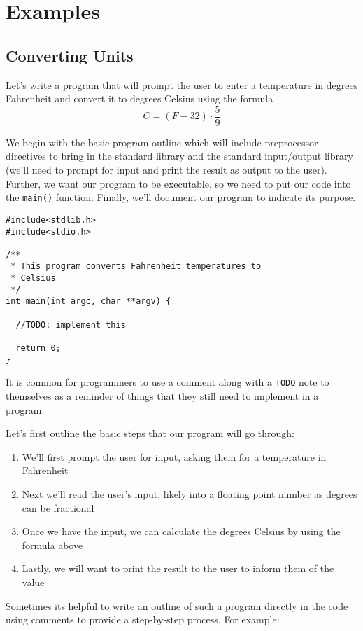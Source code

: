 \section{Examples}

\subsection{Converting Units}

Let's write a program that will prompt the user to enter a temperature
in degrees Fahrenheit and convert it to degrees Celsius using the formula
  $$C = (F - 32) \cdot \frac{5}{9}$$

We begin with the basic program outline which will include preprocessor directives to bring
in the standard library and the standard input/output library (we'll need to prompt
for input and print the result as output to the user).  Further, we want our program to 
be executable, so we need to put our code into the \texttt{main()} function.  Finally, we'll document
our program to indicate its purpose.

\begin{verbatim}
#include<stdlib.h>
#include<stdio.h>

/**
 * This program converts Fahrenheit temperatures to 
 * Celsius
 */
int main(int argc, char **argv) {

  //TODO: implement this
  
  return 0;
}
\end{verbatim}

It is common for programmers to use a comment along with a \texttt{TODO} note to
themselves as a reminder of things that they still need to implement in a program.  

Let's first outline the basic steps that our program will go through:
\begin{enumerate}
  \item We'll first prompt the user for input, asking them for a temperature in Fahrenheit
  \item Next we'll read the user's input, likely into a floating point number as degrees can be fractional
  \item Once we have the input, we can calculate the degrees Celsius by using the formula above
  \item Lastly, we will want to print the result to the user to inform them of the value
\end{enumerate}
Sometimes its helpful to write an outline of such a program directly in the code using
comments to provide a step-by-step process.  For example:


